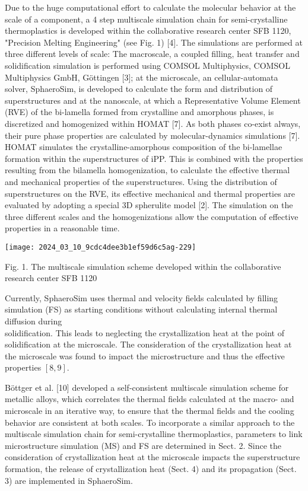 \documentclass[10pt]{article}
\begin{document}
Due to the huge computational effort to calculate the molecular behavior at the scale of a component, a 4 step multiscale simulation chain for semi-crystalline thermoplastics is developed within the collaborative research center SFB 1120, "Precision Melting Engineering" (see Fig. 1) [4]. The simulations are performed at three different levels of scale: The macroscale, a coupled filling, heat transfer and solidification simulation is performed using COMSOL Multiphysics, COMSOL Multiphysics GmbH, Göttingen [3]; at the microscale, an cellular-automata solver, SphaeroSim, is developed to calculate the form and distribution of superstructures and at the nanoscale, at which a Representative Volume Element (RVE) of the bi-lamella formed from crystalline and amorphous phases, is discretized and homogenized within HOMAT [7]. As both phases co-exist always, their pure phase properties are calculated by molecular-dynamics simulations [7]. HOMAT simulates the crystalline-amorphous composition of the bi-lamellae formation within the superstructures of iPP. This is combined with the properties resulting from the bilamella homogenization, to calculate the effective thermal and mechanical properties of the superstructures. Using the distribution of superstructures on the RVE, its effective mechanical and thermal properties are evaluated by adopting a special 3D spherulite model [2]. The simulation on the three different scales and the homogenizations allow the computation of effective properties in a reasonable time.

\begin{center}
\texttt{[image: 2024\_03\_10\_9cdc4dee3b1ef59d6c5ag-229]}
\end{center}

Fig. 1. The multiscale simulation scheme developed within the collaborative research center SFB 1120

Currently, SphaeroSim uses thermal and velocity fields calculated by filling simulation (FS) as starting conditions without calculating internal thermal diffusion during\\
solidification. This leads to neglecting the crystallization heat at the point of solidification at the microscale. The consideration of the crystallization heat at the microscale was found to impact the microstructure and thus the effective properties $[8,9]$.

Böttger et al. [10] developed a self-consistent multiscale simulation scheme for metallic alloys, which correlates the thermal fields calculated at the macro- and microscale in an iterative way, to ensure that the thermal fields and the cooling behavior are consistent at both scales. To incorporate a similar approach to the multiscale simulation chain for semi-crystalline thermoplastics, parameters to link microstructure simulation (MS) and FS are determined in Sect. 2. Since the consideration of crystallization heat at the microscale impacts the superstructure formation, the release of crystallization heat (Sect. 4) and its propagation (Sect. 3) are implemented in SphaeroSim.
\end{document}
